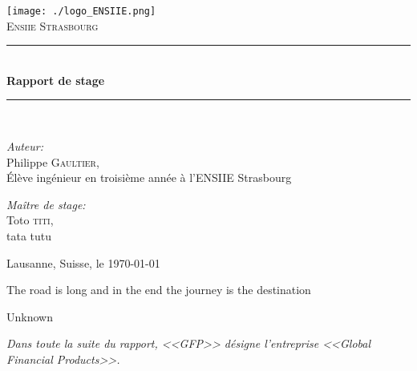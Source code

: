 \documentclass[a4paper,french,12pt]{article}
\newcommand{\HRule}{\rule{\linewidth}{0.5mm}}
\begin{document}
\begin{titlepage}
\begin{center}

\texttt{[image: ./logo\_ENSIIE.png]}~\\[1cm]
\textsc{\huge Ensiie Strasbourg}\\[1.5cm]

\HRule \\[0.4cm]
{
	\huge \bfseries Rapport de stage
\\[0.4cm] }
\HRule \\[1.5cm]

\begin{minipage}{0.4\textwidth}
\begin{flushleft} \huge
\emph{Auteur:}\\
Philippe \textsc{Gaultier},\\[0.5cm]
\Large \'Elève ingénieur en troisième année à l'ENSIIE Strasbourg
\end{flushleft}
\end{minipage}
\begin{minipage}{0.4\textwidth}
\begin{flushright} \huge
\emph{Maître de stage:} \\
Toto \textsc{titi},\\[0.5cm]
\Large tata tutu
\end{flushright}
\end{minipage}

\vfill

{\large Lausanne, Suisse, le \today}



\end{center}
\end{titlepage}

\newpage
{
  \centering
  {
    \vspace{3cm}

    \vspace{3cm}
    \epigraph{The road is long and in the end the journey is the destination}{Unknown}
  }
}
\newpage
\textit{\normalsize Dans toute la suite du rapport, <<GFP>> désigne l'entreprise <<Global Financial Products>>.}
\setlength{\columnseprule}{0.5pt}

\tableofcontents
\listoffigures
\end{document}
